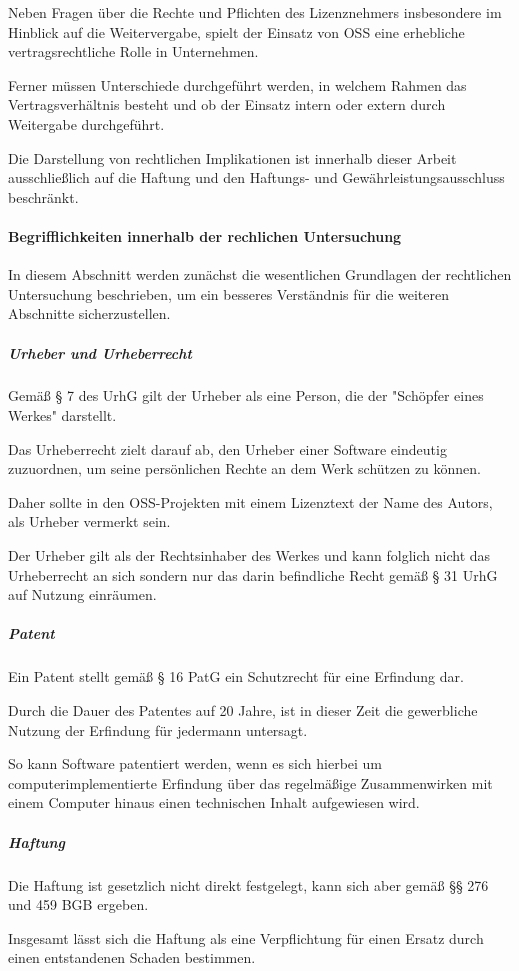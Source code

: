 Neben Fragen über die Rechte und Pflichten des Lizenznehmers insbesondere im Hinblick auf die Weitervergabe, spielt der Einsatz von OSS eine erhebliche vertragsrechtliche Rolle in Unternehmen. 

Ferner müssen Unterschiede durchgeführt werden, in welchem Rahmen das Vertragsverhältnis besteht und ob der Einsatz intern oder extern durch Weitergabe durchgeführt. 

Die Darstellung von rechtlichen Implikationen ist innerhalb dieser Arbeit ausschließlich auf die Haftung und den Haftungs- und Gewährleistungsausschluss beschränkt. 

\paragraph{Begrifflichkeiten innerhalb der rechlichen Untersuchung}
In diesem Abschnitt werden zunächst die wesentlichen Grundlagen der rechtlichen Untersuchung beschrieben, um ein besseres Verständnis für die weiteren Abschnitte sicherzustellen. 

\subparagraph{Urheber und Urheberrecht}
Gemäß § 7 des UrhG gilt der Urheber als eine Person, die der "Schöpfer eines Werkes" darstellt. 

Das Urheberrecht zielt darauf ab, den Urheber einer Software eindeutig zuzuordnen, um seine persönlichen Rechte an dem Werk schützen zu können.

Daher sollte in den OSS-Projekten mit einem Lizenztext der Name des Autors, als Urheber vermerkt sein. 

Der Urheber gilt als der Rechtsinhaber des Werkes und kann folglich nicht das Urheberrecht an sich sondern nur das darin befindliche Recht gemäß § 31 UrhG auf Nutzung einräumen. 

\subparagraph{Patent}
Ein Patent stellt gemäß § 16 PatG ein Schutzrecht für eine Erfindung dar. 

Durch die Dauer des Patentes auf 20 Jahre, ist in dieser Zeit die gewerbliche Nutzung der Erfindung für jedermann untersagt. 

So kann Software patentiert werden, wenn es sich hierbei um computerimplementierte Erfindung über das regelmäßige Zusammenwirken mit einem Computer hinaus einen technischen Inhalt aufgewiesen wird. 

\subparagraph{Haftung}
Die Haftung ist gesetzlich nicht direkt festgelegt, kann sich aber gemäß §§ 276 und 459 BGB ergeben. 

Insgesamt lässt sich die Haftung als eine Verpflichtung für einen Ersatz durch einen entstandenen Schaden bestimmen. 

